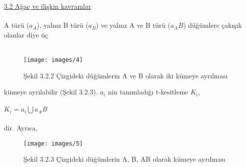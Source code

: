 \documentclass[11pt]{amsbook}
\begin{document}
\underline{3.2 Ağaç ve ilişkin  kavramlar \hspace*{70ex} }\\ \\

A türü ($a_A$), yalnız B türü ($a_B$) ve yalnız A ve B türü ($a_AB$) düğümlere çakışık olanlar diye üç\\\\

	\begin{figure}[htb]
		\centering
		\texttt{[image: images/4]}
		\caption*{ Şekil 3.2.2 Çizgideki düğümlerin A ve B olarak iki kümeye ayrılması }
		\label{fig:Aa}
	\end{figure}

kümeye ayrılabilir (Şekil 3.2.3). $a_i$ nin tanımladığı t-kesitleme $K_i$,\\ \\
\hspace*{20ex}  $K_i  =  a_i  \bigcup  a_AB $\\ \\
dir. Ayrıca,\\
\begin{figure}[htb]
	\centering
	\texttt{[image: images/5]}
	\caption*{ Şekil 3.2.3 Çizgideki düğümlerin A, B, AB olarak  kümeye ayrılması }
	\label{fig:Bb}
\end{figure}
\end{document}
